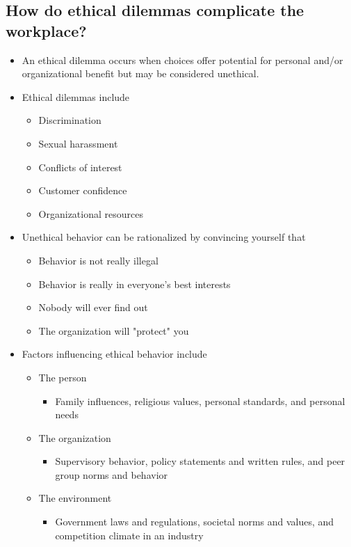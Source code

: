 \documentclass[11pt]{article}
\begin{document}
\subsection*{How do ethical dilemmas complicate the workplace?}
\label{sec:orgd57e787}
\begin{itemize}
\item An ethical dilemma occurs when choices offer potential for personal and/or organizational benefit but may be considered unethical.
\item Ethical dilemmas include
\begin{itemize}
\item Discrimination
\item Sexual harassment
\item Conflicts of interest
\item Customer confidence
\item Organizational resources
\end{itemize}
\item Unethical behavior can be rationalized by convincing yourself that
\begin{itemize}
\item Behavior is not really illegal
\item Behavior is really in everyone's best interests
\item Nobody will ever find out
\item The organization will "protect" you
\end{itemize}
\item Factors influencing ethical behavior include
\begin{itemize}
\item The person
\begin{itemize}
\item Family influences, religious values, personal standards, and personal needs
\end{itemize}
\item The organization
\begin{itemize}
\item Supervisory behavior, policy statements and written rules, and peer group norms and behavior
\end{itemize}
\item The environment
\begin{itemize}
\item Government laws and regulations, societal norms and values, and competition climate in an industry
\end{itemize}
\end{itemize}
\end{itemize}
\end{document}
